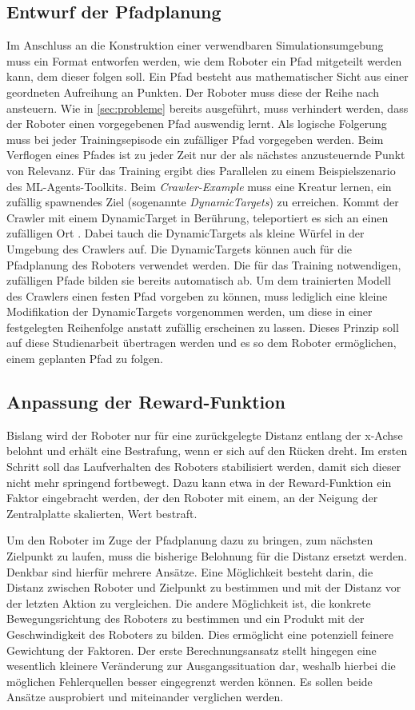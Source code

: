 \subsection{Entwurf der Pfadplanung}
Im Anschluss an die Konstruktion einer verwendbaren Simulationsumgebung muss ein Format entworfen werden, wie dem Roboter ein Pfad mitgeteilt werden kann, dem dieser folgen soll.
Ein Pfad besteht aus mathematischer Sicht aus einer geordneten Aufreihung an Punkten.
Der Roboter muss diese der Reihe nach ansteuern.
Wie in \autoref{sec:probleme} bereits ausgeführt, muss verhindert werden, dass der Roboter einen vorgegebenen Pfad auswendig lernt.
Als logische Folgerung muss bei jeder Trainingsepisode ein zufälliger Pfad vorgegeben werden.
Beim Verflogen eines Pfades ist zu jeder Zeit nur der als nächstes anzusteuernde Punkt von Relevanz.
Für das Training ergibt dies Parallelen zu einem Beispielszenario des ML-Agents-Toolkits.
Beim \emph{Crawler-Example} muss eine Kreatur lernen, ein zufällig spawnendes Ziel (sogenannte \emph{DynamicTargets}) zu erreichen.
Kommt der Crawler mit einem DynamicTarget in Berührung, teleportiert es sich an einen zufälligen Ort \cite{crawlerExample}.
Dabei tauch die DynamicTargets als kleine Würfel in der Umgebung des Crawlers auf.
Die DynamicTargets können auch für die Pfadplanung des Roboters verwendet werden.
Die für das Training notwendigen, zufälligen Pfade bilden sie bereits automatisch ab.
Um dem trainierten Modell des Crawlers einen festen Pfad vorgeben zu können, muss lediglich eine kleine Modifikation der DynamicTargets vorgenommen werden, um diese in einer festgelegten Reihenfolge anstatt zufällig erscheinen zu lassen.
Dieses Prinzip soll auf diese Studienarbeit übertragen werden und es so dem Roboter ermöglichen, einem geplanten Pfad zu folgen.

\subsection{Anpassung der Reward-Funktion}
Bislang wird der Roboter nur für eine zurückgelegte Distanz entlang der x-Achse belohnt und erhält eine Bestrafung, wenn er sich auf den Rücken dreht.
Im ersten Schritt soll das Laufverhalten des Roboters stabilisiert werden, damit sich dieser nicht mehr springend fortbewegt.
Dazu kann etwa in der Reward-Funktion ein Faktor eingebracht werden, der den Roboter mit einem, an der Neigung der Zentralplatte skalierten, Wert bestraft.

Um den Roboter im Zuge der Pfadplanung dazu zu bringen, zum nächsten Zielpunkt zu laufen, muss die bisherige Belohnung für die Distanz ersetzt werden.
Denkbar sind hierfür mehrere Ansätze.
Eine Möglichkeit besteht darin, die Distanz zwischen Roboter und Zielpunkt zu bestimmen und mit der Distanz vor der letzten Aktion zu vergleichen.
Die andere Möglichkeit ist, die konkrete Bewegungsrichtung des Roboters zu bestimmen und ein Produkt mit der Geschwindigkeit des Roboters zu bilden.
Dies ermöglicht eine potenziell feinere Gewichtung der Faktoren.
Der erste Berechnungsansatz stellt hingegen eine wesentlich kleinere Veränderung zur Ausgangssituation dar, weshalb hierbei die möglichen Fehlerquellen besser eingegrenzt werden können.
Es sollen beide Ansätze ausprobiert und miteinander verglichen werden.


